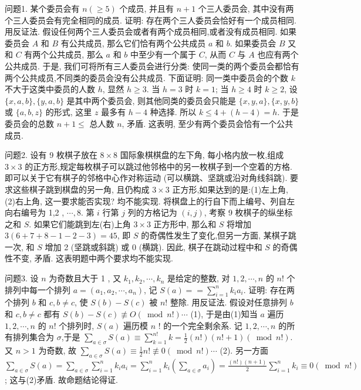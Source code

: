 
问题1. 某个委员会有 $n(\geqslant 5)$ 个成员, 并且有 $n+1$ 个三人委员会, 其中没有两个三人委员会有完全相同的成员.
证明: 存在两个三人委员会恰好有一个成员相同.
用反证法.
假设任何两个三人委员会或者有两个成员相同,或者没有成员相同.
如果委员会 $A$ 和 $B$ 有公共成员, 那么它们恰有两个公共成员 $a$ 和 $b$. 如果委员会 $B$ 又和 $C$ 有两个公共成员, 那么 $a$ 和 $b$ 中至少有一个属于 $C$, 从而 $C$ 与 $A$ 也应有两个公共成员.
于是, 我们可将所有三人委员会进行分类: 使同一类的两个委员会都恰有两个公共成员,不同类的委员会没有公共成员.
下面证明: 同一类中委员会的个数 $k$ 不大于这类中委员的人数 $h$, 显然 $h \geqslant 3$. 当 $h=3$ 时 $k=1$; 当 $h \geqslant 4$ 时 $k \geqslant 2$, 设 $\{x, a, b\},\{y, a, b\}$ 是其中两个委员会, 则其他同类的委员会只能是 $\{x, y, a\},\{x, y, b\}$ 或 $\{a, b, z\}$ 的形式, 这里 $z$ 最多有 $h-4$ 种选择.
所以 $k \leqslant 4+(h-4)=h$. 于是委员会的总数 $n+1 \leqslant$ 总人数 $n$, 矛盾.
这表明, 至少有两个委员会恰有一个公共成员.



问题2. 设有 9 枚棋子放在 $8 \times 8$ 国际象棋棋盘的左下角, 每小格内放一枚,组成 $3 \times 3$ 的正方形,规定每枚棋子可以跳过他邻格中的另一枚棋子到一个空着的方格.
即可以关于它有棋子的邻格中心作对称运动 (可以横跳、坚跳或沿对角线斜跳). 要求这些棋子跳到棋盘的另一角, 且仍构成 $3 \times 3$ 正方形,如果达到的是:(1)左上角, (2)右上角, 这一要求能否实现?
均不能实现.
将棋盘上的行自下而上编号、列自左向右编号为 1,2 , $\cdots, 8$. 第 $i$ 行第 $j$ 列的方格记为 $(i, j)$, 考察 9 枚棋子的纵坐标之和 $S$. 如果它们能跳到左(右)上角 $3 \times 3$ 正方形中, 那么和 $S$ 将增加 $3(6+7+8-1-2-3 )=45$, 即 $S$ 的奇偶性发生了变化,但另一方面, 某棋子跳一次, 和 $S$ 增加 2 (坚跳或斜跳) 或 0 (横跳). 因此, 棋子在跳动过程中和 $S$ 的奇偶性不变, 矛盾.
这表明题中两个要求均不能实现.



问题3. 设 $n$ 为奇数且大于 1 , 又 $k_1, k_2, \cdots, k_n$ 是给定的整数, 对 $1,2, \cdots, n$ 的 $n !$ 个排列中每一个排列 $a=\left(a_1, a_2, \cdots, a_n\right)$, 记 $S(a)==\sum_{i=1}^n k_i a_i$. 证明: 存在两个排列 $b$ 和 $c, b \neq c$, 使 $S(b)-S(c)$ 被 $n !$ 整除.
用反证法.
假设对任意排列 $b$ 和 $c, b \neq c$ 都有 $S(b)-S(c) \not \equiv O(\bmod n !) \cdots$ (1), 
于是由(1)知当 $a$ 遍历 $1,2, \cdots, n$ 的 $n !$ 个排列时, $S(a)$ 遍历模 $n$ ! 的一个完全剩余系.
记 $1,2, \cdots, n$ 的所有排列集合为 $\sigma$,于是 $\sum_{a \in \sigma} S(a) \equiv \sum_{k=1}^{n !} k=\frac{1}{2}(n !)(n !+1)(\bmod n !)$. 
又 $n>1$ 为奇数, 故 $\sum_{a \in \sigma} S(a) \equiv \frac{1}{2} n ! \not \equiv 0(\bmod n !) \cdots$ (2). 
另一方面 $\sum_{a \in \sigma} S(a)=\sum_{a \in \sigma} \sum_{i=1}^n k_i a_i=\sum_{i=1}^n k_i\left(\sum_{a \in \sigma} a_i\right)= \frac{(n !)(n+1)}{2} \sum_{i=1}^n k_i \equiv 0(\bmod n !)$; 这与(2)矛盾.
故命题结论得证.




